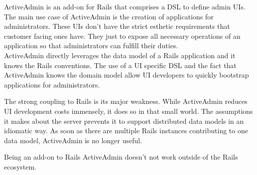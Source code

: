 ActiveAdmin is an add-on for Rails that comprises a DSL to define admin UIs. The main use case of ActiveAdmin is the creation of applications for administrators. These UIs don't have the strict esthetic requirements that customer facing ones have. They just to expose all necessary operations of an application so that administrators can fulfill their duties. \\ ActiveAdmin directly leverages the data model of a Rails application and it knows the Rails conventions. The use of a UI specific DSL and the fact that ActiveAdmin knows the domain model allow UI developers to quickly bootstrap applications for administrators.

The strong coupling to Rails is its major weakness. While ActiveAdmin reduces UI development costs immensely, it does so in that small world. The assumptions it makes about the server prevents it to support distributed data models in an idiomatic way. As soon as there are multiple Rails instances contributing to one data model, ActiveAdmin is no longer useful.

Being an add-on to Rails ActiveAdmin doesn't not work outside of the Rails ecosystem.
